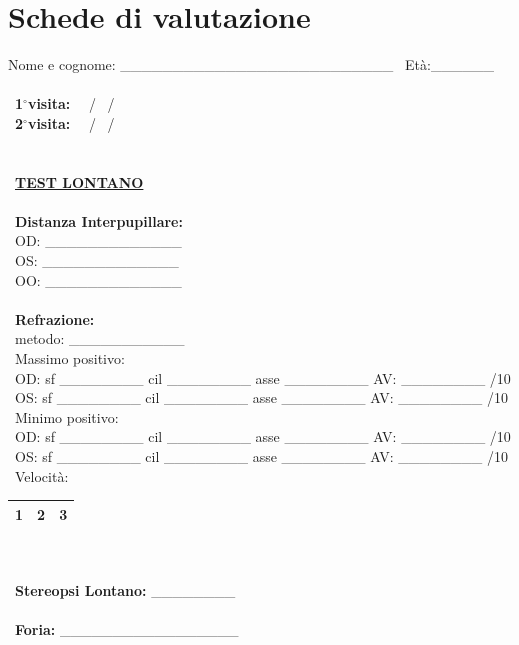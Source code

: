 \chapter{Schede di valutazione}

Nome e cognome: \_\_\_\_\_\_\_\_\_\_\_\_\_\_\_\_\_\_\_\_\_\_\_\_\_\_ \  Età:\_\_\_\_\_\_
\\\ \\\
\textbf{1$^{\circ}$visita:}  \ \ / \    /
\\\
\textbf{2$^{\circ}$visita:}  \ \ / \    /
\\\ \\\ \\\
\underline{\textbf{TEST LONTANO}}
\\\ \\\
\textbf{Distanza Interpupillare:}
\\\
OD: \_\_\_\_\_\_\_\_\_\_\_\_\_
\\\
OS: \_\_\_\_\_\_\_\_\_\_\_\_\_
\\\
OO: \_\_\_\_\_\_\_\_\_\_\_\_\_
\\\ \\\
\textbf{Refrazione:}
\\\
metodo: \_\_\_\_\_\_\_\_\_\_\_
\\\
Massimo positivo:
\\\
OD: sf \_\_\_\_\_\_\_\_ cil \_\_\_\_\_\_\_\_ asse \_\_\_\_\_\_\_\_ AV: \_\_\_\_\_\_\_\_ /10
\\\
OS: sf \_\_\_\_\_\_\_\_ cil \_\_\_\_\_\_\_\_ asse \_\_\_\_\_\_\_\_ AV: \_\_\_\_\_\_\_\_ /10
\\\
Minimo positivo:
\\\
OD: sf \_\_\_\_\_\_\_\_ cil \_\_\_\_\_\_\_\_ asse \_\_\_\_\_\_\_\_ AV: \_\_\_\_\_\_\_\_ /10
\\\
OS: sf \_\_\_\_\_\_\_\_ cil \_\_\_\_\_\_\_\_ asse \_\_\_\_\_\_\_\_ AV: \_\_\_\_\_\_\_\_ /10
\\\
Velocità:
\begin{table}[H]
\begin{tabular}{|c|c|c|} \hline
{\textbf{1}} & {\textbf{2}} & {\textbf{3}}\\ \hline
\end{tabular}
\end{table}
\\\ \\\
\textbf{Stereopsi Lontano:} \_\_\_\_\_\_\_\_
\\\ \\\
\textbf{Foria:} \_\_\_\_\_\_\_\_\_\_\_\_\_\_\_\_\_
\\\ \\\ \\\ \\\ \\\
